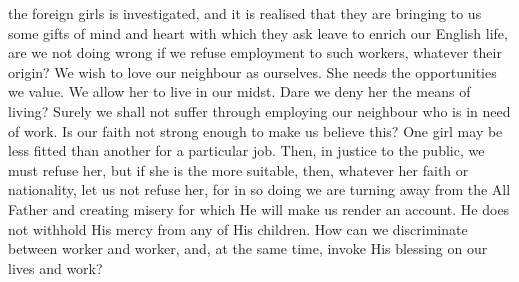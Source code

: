 the foreign girls is investigated, and it is realised that they
are bringing to us some gifts of mind and heart with
which they ask leave to enrich our English life, are we
not doing wrong if we refuse employment to such
workers, whatever their origin? We wish to love our
neighbour as ourselves. She needs the opportunities we
value. We allow her to live in our midst. Dare we deny
her the means of living? Surely we shall not suffer
through employing our neighbour who is in need of work.
Is our faith not strong enough to make us believe this?
One girl may be less fitted than another for a particular
job. Then, in justice to the public, we must refuse her,
but if she is the more suitable, then, whatever her faith
or nationality, let us not refuse her, for in so doing we
are turning away from the All Father and creating misery
for which He will make us render an account. He does
not withhold His mercy from any of His children. How
can we discriminate between worker and worker, and, at
the same time, invoke His blessing on our lives and work?
